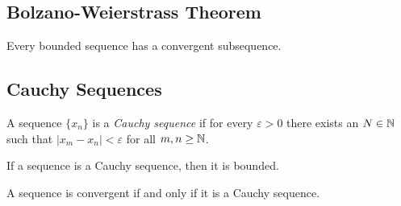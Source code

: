 \documentclass[12pt]{article}
\begin{document}
\subsection{Bolzano-Weierstrass Theorem}
\begin{theorem}
    Every bounded sequence has a convergent subsequence.
\end{theorem}

\subsection{Cauchy Sequences}
\begin{definition}
    A sequence \(\{x_n\}\) is a \textit{Cauchy sequence} if for every
    \(\varepsilon>0\) there exists an \(N\in\mathbb{N}\) such that
    \(|x_m-x_n|<\varepsilon\) for all \(m,n\geq\mathbb{N}\).
\end{definition}
\begin{theorem}
    If a sequence is a Cauchy sequence, then it is bounded.
\end{theorem}
\begin{theorem}
    A sequence is convergent if and only if it is a Cauchy sequence.
\end{theorem}
\end{document}
